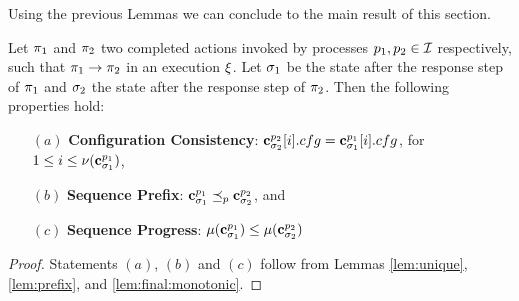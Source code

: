 Using the previous Lemmas we can conclude to the main result of this section.

\begin{theorem}
\label{thm:recon:properties}
	Let $\pi_1$ and $\pi_2$ two 
completed  actions invoked by processes $p_1, p_2\in\mathcal{I}$ 
respectively, such that $\pi_1\rightarrow\pi_2$ in an execution $\EX$. 
Let $\sigma_1$ be the state after the response 
step of $\pi_1$ and $\sigma_2$ the state after the response step 
of $\pi_2$.
Then the following properties hold: 
\begin{enumerate}
\item [$(a)$] 
\textbf{Configuration Consistency}: $\mathbf{c}^{p_2}_{\sigma_2}[i].cfg = \mathbf{c}^{p_1}_{\sigma_1}[i].cfg$,  for $ 1 \leq i \leq \nu(\mathbf{c}^{p_1}_{\sigma_1})$,
\item [$(b)$]
 \textbf{Sequence Prefix}: 
 $\mathbf{c}^{p_1}_{\sigma_1}  \preceq_p \mathbf{c}^{p_2}_{\sigma_2}$, and
\item [$(c)$] 
\textbf{Sequence Progress}:
  $\mu(\mathbf{c}^{p_1}_{\sigma_1}) \leq \mu(\mathbf{c}^{p_2}_{\sigma_2})$
\end{enumerate}
\end{theorem}

\begin{proof}
Statements $(a)$, $(b)$ and $(c)$ follow from Lemmas \ref{lem:unique}, \ref{lem:prefix}, and 
\ref{lem:final:monotonic}.
\end{proof}